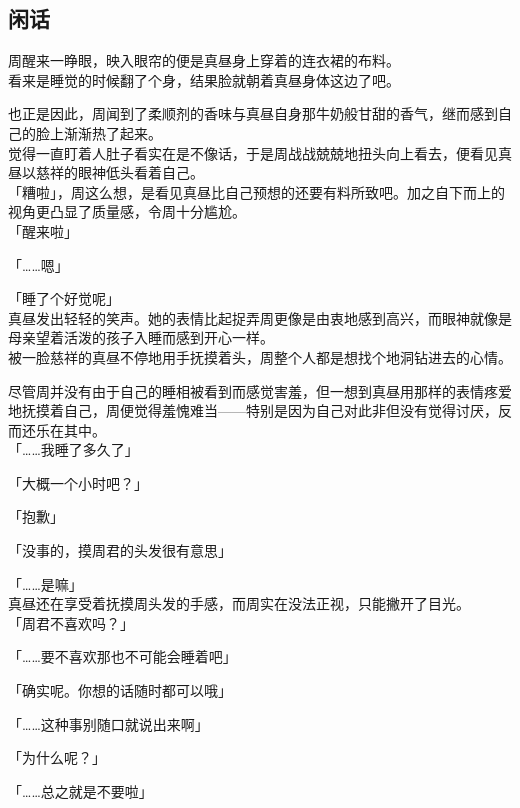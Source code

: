 \subsection{闲话}

周醒来一睁眼，映入眼帘的便是真昼身上穿着的连衣裙的布料。\\

看来是睡觉的时候翻了个身，结果脸就朝着真昼身体这边了吧。

也正是因此，周闻到了柔顺剂的香味与真昼自身那牛奶般甘甜的香气，继而感到自己的脸上渐渐热了起来。\\

觉得一直盯着人肚子看实在是不像话，于是周战战兢兢地扭头向上看去，便看见真昼以慈祥的眼神低头看着自己。\\

「糟啦」，周这么想，是看见真昼比自己预想的还要有料所致吧。加之自下而上的视角更凸显了质量感，令周十分尴尬。\\

「醒来啦」

「……嗯」

「睡了个好觉呢」\\

真昼发出轻轻的笑声。她的表情比起捉弄周更像是由衷地感到高兴，而眼神就像是母亲望着活泼的孩子入睡而感到开心一样。\\

被一脸慈祥的真昼不停地用手抚摸着头，周整个人都是想找个地洞钻进去的心情。

尽管周并没有由于自己的睡相被看到而感觉害羞，但一想到真昼用那样的表情疼爱地抚摸着自己，周便觉得羞愧难当——特别是因为自己对此非但没有觉得讨厌，反而还乐在其中。\\

「……我睡了多久了」

「大概一个小时吧？」

「抱歉」

「没事的，摸周君的头发很有意思」

「……是嘛」\\

真昼还在享受着抚摸周头发的手感，而周实在没法正视，只能撇开了目光。\\

「周君不喜欢吗？」

「……要不喜欢那也不可能会睡着吧」

「确实呢。你想的话随时都可以哦」

「……这种事别随口就说出来啊」

「为什么呢？」

「……总之就是不要啦」\\

